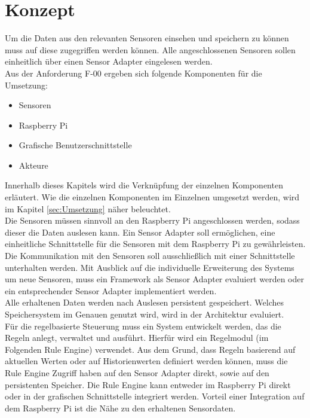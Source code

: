 \section{Konzept}
Um die Daten aus den relevanten Sensoren einsehen und speichern zu können muss auf diese zugegriffen werden können. Alle angeschlossenen Sensoren sollen einheitlich über einen Sensor Adapter eingelesen werden.\\
Aus der Anforderung F-00 ergeben sich folgende Komponenten für die Umsetzung:
\begin{itemize}
	\item Sensoren
	\item Raspberry Pi
	\item Grafische Benutzerschnittstelle
	\item Akteure
\end{itemize}
Innerhalb dieses Kapitels wird die Verknüpfung der einzelnen Komponenten erläutert. Wie die einzelnen Komponenten im Einzelnen umgesetzt werden, wird im Kapitel \ref{sec:Umsetzung} näher beleuchtet.\\
Die Sensoren müssen sinnvoll an den Raspberry Pi angeschlossen werden, sodass dieser die Daten auslesen kann. Ein Sensor Adapter soll ermöglichen, eine einheitliche Schnittstelle für die Sensoren mit dem Raspberry Pi zu gewährleisten. Die Kommunikation mit den Sensoren soll ausschließlich mit einer Schnittstelle unterhalten werden. Mit Ausblick auf die individuelle Erweiterung des Systems um neue Sensoren, muss ein Framework als Sensor Adapter evaluiert werden oder ein entsprechender Sensor Adapter implementiert werden.\\
Alle erhaltenen Daten werden nach Auslesen persistent gespeichert. Welches Speichersystem im Genauen genutzt wird, wird in der Architektur evaluiert.\\
Für die regelbasierte Steuerung muss ein System entwickelt werden, das die Regeln anlegt, verwaltet und ausführt. Hierfür wird ein Regelmodul (im Folgenden Rule Engine) verwendet. Aus dem Grund, dass Regeln basierend auf aktuellen Werten oder auf Historienwerten definiert werden können, muss die Rule Engine Zugriff haben auf den Sensor Adapter direkt, sowie auf den persistenten Speicher. Die Rule Engine kann entweder im Raspberry Pi direkt oder in der grafischen Schnittstelle integriert werden. Vorteil einer Integration auf dem Raspberry Pi ist die Nähe zu den erhaltenen Sensordaten.\\
